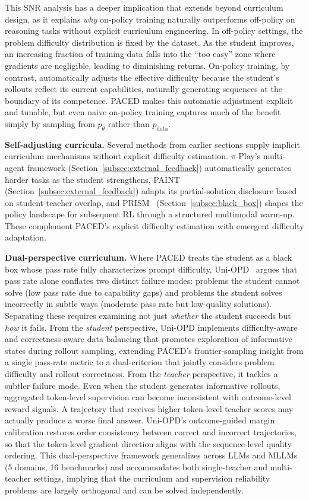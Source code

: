\documentclass{article} %
\newcommand{\ptheta}{p_\theta}
\newcommand{\pdata}{p_{\mathrm{data}}}
\begin{document}
This SNR analysis has a deeper implication that extends beyond curriculum design, as it explains \emph{why} on-policy training naturally outperforms off-policy on reasoning tasks without explicit curriculum engineering. In off-policy settings, the problem difficulty distribution is fixed by the dataset. As the student improves, an increasing fraction of training data falls into the ``too easy'' zone where gradients are negligible, leading to diminishing returns. On-policy training, by contrast, automatically adjusts the effective difficulty because the student's rollouts reflect its current capabilities, naturally generating sequences at the boundary of its competence. PACED makes this automatic adjustment explicit and tunable, but even naive on-policy training captures much of the benefit simply by sampling from $\ptheta$ rather than $\pdata$.

\textbf{Self-adjusting curricula.} Several methods from earlier sections supply implicit curriculum mechanisms without explicit difficulty estimation. $\pi$-Play's multi-agent framework (Section~\ref{subsec:external_feedback}) automatically generates harder tasks as the student strengthens, PAINT~\citep{wang2026paint} (Section~\ref{subsec:external_feedback}) adapts its partial-solution disclosure based on student-teacher overlap, and PRISM~\citep{wang2026prism} (Section~\ref{subsec:black_box}) shapes the policy landscape for subsequent RL through a structured multimodal warm-up. These complement PACED's explicit difficulty estimation with emergent difficulty adaptation.

\textbf{Dual-perspective curriculum.} Where PACED treats the student as a black box whose pass rate fully characterizes prompt difficulty, Uni-OPD~\citep{hou2026uniopd} argues that pass rate alone conflates two distinct failure modes: problems the student cannot solve (low pass rate due to capability gaps) and problems the student solves incorrectly in subtle ways (moderate pass rate but low-quality solutions). Separating these requires examining not just \emph{whether} the student succeeds but \emph{how} it fails. From the \emph{student} perspective, Uni-OPD implements difficulty-aware and correctness-aware data balancing that promotes exploration of informative states during rollout sampling, extending PACED's frontier-sampling insight from a single pass-rate metric to a dual-criterion that jointly considers problem difficulty and rollout correctness. From the \emph{teacher} perspective, it tackles a subtler failure mode. Even when the student generates informative rollouts, aggregated token-level supervision can become inconsistent with outcome-level reward signals. A trajectory that receives higher token-level teacher scores may actually produce a worse final answer. Uni-OPD's outcome-guided margin calibration restores order consistency between correct and incorrect trajectories, so that the token-level gradient direction aligns with the sequence-level quality ordering. This dual-perspective framework generalizes across LLMs and MLLMs (5 domains, 16 benchmarks) and accommodates both single-teacher and multi-teacher settings, implying that the curriculum and supervision reliability problems are largely orthogonal and can be solved independently.
\end{document}
